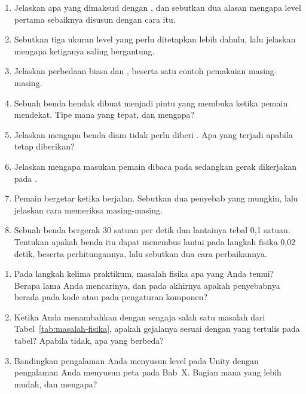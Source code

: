 
\begin{enumerate}
  \item Jelaskan apa yang dimaksud dengan , dan sebutkan
        dua alasan mengapa level pertama sebaiknya disusun dengan cara itu.

  \item Sebutkan tiga ukuran level yang perlu ditetapkan lebih dahulu, lalu
        jelaskan mengapa ketiganya saling bergantung.

  \item Jelaskan perbedaan  biasa dan ,
        beserta satu contoh pemakaian masing-masing.

  \item Sebuah benda hendak dibuat menjadi pintu yang membuka ketika pemain
        mendekat. Tipe  mana yang tepat, dan mengapa?

  \item Jelaskan mengapa benda diam tidak perlu diberi .
        Apa yang terjadi apabila tetap diberikan?

  \item Jelaskan mengapa masukan pemain dibaca pada  sedangkan
        gerak  dikerjakan pada .

  \item Pemain bergetar ketika berjalan. Sebutkan dua penyebab yang mungkin,
        lalu jelaskan cara memeriksa masing-masing.

  \item Sebuah benda bergerak 30 satuan per detik dan lantainya tebal 0,1
        satuan. Tentukan apakah benda itu dapat menembus lantai pada langkah
        fisika 0,02 detik, beserta perhitungannya, lalu sebutkan dua cara
        perbaikannya.
\end{enumerate}

\begin{refleksibox}
\begin{enumerate}
  \item Pada langkah kelima praktikum, masalah fisika apa yang Anda temui?
        Berapa lama Anda mencarinya, dan pada akhirnya apakah penyebabnya
        berada pada kode atau pada pengaturan komponen?

  \item Ketika Anda menambahkan dengan sengaja salah satu masalah dari
        Tabel~\ref{tab:masalah-fisika}, apakah gejalanya sesuai dengan yang
        tertulis pada tabel? Apabila tidak, apa yang berbeda?

  \item Bandingkan pengalaman Anda menyusun level pada Unity dengan pengalaman
        Anda menyusun peta pada Bab~X. Bagian mana yang lebih mudah, dan
        mengapa?
\end{enumerate}
\end{refleksibox}
